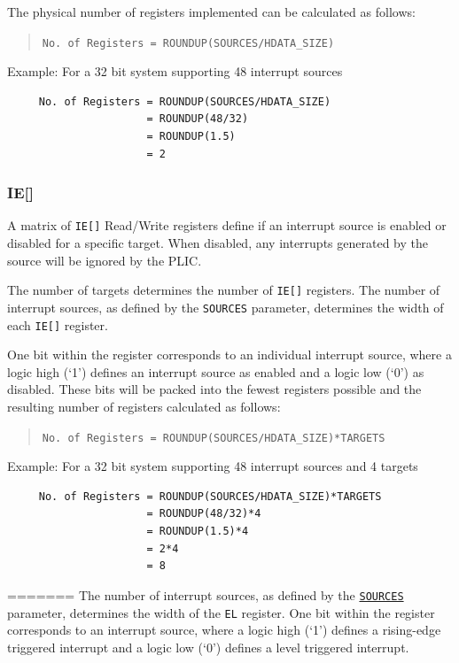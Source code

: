 The physical number of registers implemented can be calculated as
follows:

\begin{quote}
	\texttt{No.\ of\ Registers\ =\ ROUNDUP(SOURCES/HDATA\_SIZE)}
\end{quote}

Example: For a 32 bit system supporting 48 interrupt sources

\begin{verbatim}
     No. of Registers = ROUNDUP(SOURCES/HDATA_SIZE)   
                      = ROUNDUP(48/32)
                      = ROUNDUP(1.5)
                      = 2
\end{verbatim}

\subsubsection{IE[]}

A matrix of \texttt{IE[]} Read/Write registers define if an
interrupt source is enabled or disabled for a specific target. When
disabled, any interrupts generated by the source will be ignored by the
PLIC.

The number of targets determines the number of \texttt{IE[]}
registers. The number of interrupt sources, as defined by the
\texttt{SOURCES} parameter, determines the width of each \texttt{IE[]} 
register. 

One bit within the register corresponds to an individual interrupt
source, where a logic high (`1') defines an interrupt source as enabled and a
logic low (`0') as disabled. These bits will be packed into the fewest registers
possible and the resulting number of registers calculated as follows:

\begin{quote}
	\texttt{No.\ of\ Registers\ =\ ROUNDUP(SOURCES/HDATA\_SIZE)*TARGETS}
\end{quote}

Example: For a 32 bit system supporting 48 interrupt sources and 4
targets

\begin{verbatim}
     No. of Registers = ROUNDUP(SOURCES/HDATA_SIZE)*TARGETS
                      = ROUNDUP(48/32)*4
                      = ROUNDUP(1.5)*4
                      = 2*4
                      = 8
\end{verbatim}
=======
The number of interrupt sources, as defined by the \protect\hyperlink{SOURCES}{\texttt{SOURCES}} parameter, determines the width of the \texttt{EL} register.
One bit within the register corresponds to an interrupt source, where a logic high (`1') defines a rising-edge triggered interrupt and a logic low (`0') defines a level triggered interrupt.


